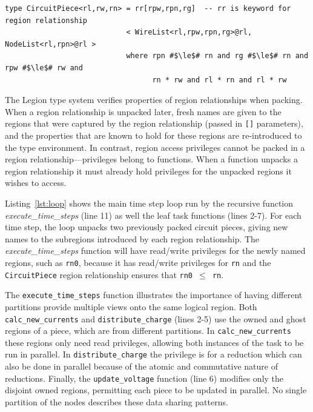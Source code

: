\begin{lstlisting}[label={lst:rr},caption={Region Relationship Example}]
type CircuitPiece<rl,rw,rn> = rr[rpw,rpn,rg]  -- rr is keyword for region relationship 
                            < WireList<rl,rpw,rpn,rg>@rl, NodeList<rl,rpn>@rl >         
                            where rpn #$\le$# rn and rg #$\le$# rn and rpw #$\le$# rw and
                                  rn * rw and rl * rn and rl * rw
\end{lstlisting}

The Legion type system verifies properties of region relationships when packing.  When
a region relationship is unpacked later, fresh names are given to the regions that were
captured by the region relationship (passed in {\tt []} parameters), and the properties that are known to hold for these
regions are re-introduced to the type environment.
In contrast, region access privileges cannot be packed in a region
relationship---privileges belong to functions. When a function unpacks
a region relationship it must already hold privileges for the unpacked regions it wishes to access.

Listing~\ref{lst:loop} shows the main time step loop run by the 
recursive function {\em execute\_time\_steps} (line 11)
as well the leaf task functions (lines 2-7).  
For each time step, the loop unpacks 
two previously packed circuit pieces, giving new names to the subregions introduced
by each region relationship.  The {\em execute\_time\_steps} function
will have read/write privileges for the newly named regions, such as {\tt rn0},
because it has read/write privileges for {\tt rn} and the {\tt CircuitPiece} 
region relationship ensures that {\tt rn0 $\leq$ rn}.

The {\tt execute\_time\_steps} function   
illustrates the importance of having different partitions provide 
multiple views onto the same logical region.  Both {\tt calc\_new\_currents} 
and {\tt distribute\_charge} (lines 2-5)
use the owned and ghost regions of a piece, which are from different partitions. In
{\tt calc\_new\_currents} these regions only need read
privileges, allowing both instances of the task to be
run in parallel.  In {\tt distribute\_charge} the
privilege is for a reduction which can also be done in parallel
because of the atomic and commutative nature of reductions.  Finally,
the {\tt update\_voltage} function (line 6) modifies only the disjoint owned regions, 
permitting each piece to be updated in parallel.  No single partition of the nodes
describes these data sharing patterns.

